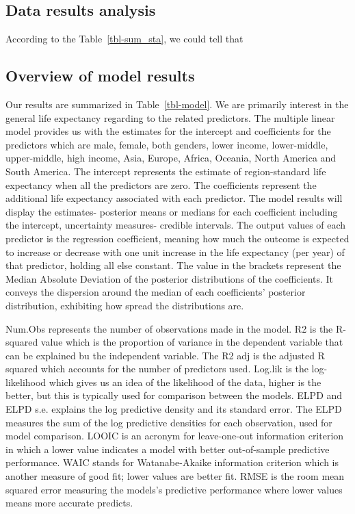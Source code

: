 \documentclass[
  letterpaper,
  DIV=11,
  numbers=noendperiod]{scrartcl}
\begin{document}
\subsection{Data results analysis}\label{data-results-analysis}

According to the Table~\ref{tbl-sum_sta}, we could tell that

\subsection{Overview of model results}\label{overview-of-model-results}

Our results are summarized in Table~\ref{tbl-model}. We are primarily
interest in the general life expectancy regarding to the related
predictors. The multiple linear model provides us with the estimates for
the intercept and coefficients for the predictors which are male,
female, both genders, lower income, lower-middle, upper-middle, high
income, Asia, Europe, Africa, Oceania, North America and South America.
The intercept represents the estimate of region-standard life expectancy
when all the predictors are zero. The coefficients represent the
additional life expectancy associated with each predictor. The model
results will display the estimates- posterior means or medians for each
coefficient including the intercept, uncertainty measures- credible
intervals. The output values of each predictor is the regression
coefficient, meaning how much the outcome is expected to increase or
decrease with one unit increase in the life expectancy (per year) of
that predictor, holding all else constant. The value in the brackets
represent the Median Absolute Deviation of the posterior distributions
of the coefficients. It conveys the dispersion around the median of each
coefficients' posterior distribution, exhibiting how spread the
distributions are.

Num.Obs represents the number of observations made in the model. R2 is
the R-squared value which is the proportion of variance in the dependent
variable that can be explained bu the independent variable. The R2 adj
is the adjusted R squared which accounts for the number of predictors
used. Log.lik is the log-likelihood which gives us an idea of the
likelihood of the data, higher is the better, but this is typically used
for comparison between the models. ELPD and ELPD s.e. explains the log
predictive density and its standard error. The ELPD measures the sum of
the log predictive densities for each observation, used for model
comparison. LOOIC is an acronym for leave-one-out information criterion
in which a lower value indicates a model with better out-of-sample
predictive performance. WAIC stands for Watanabe-Akaike information
criterion which is another measure of good fit; lower values are better
fit. RMSE is the room mean squared error measuring the models's
predictive performance where lower values means more accurate predicts.
\end{document}
